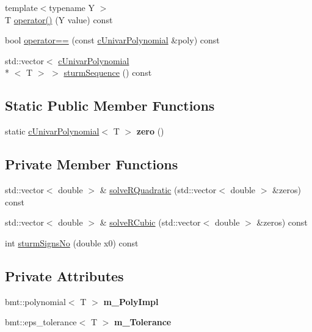 \begin{DoxyCompactItemize}
\item 
{\footnotesize template$<$typename Y $>$ }\\T \hyperlink{classcUnivarPolynomial_ada17ad11d4de132218ef45dcfb052ba4}{operator()} (Y value) const 
\item 
bool \hyperlink{classcUnivarPolynomial_a54e506b4fac4647cc8aad776ba131940}{operator==} (const \hyperlink{classcUnivarPolynomial}{c\-Univar\-Polynomial} \&poly) const 
\item 
std\-::vector$<$ \hyperlink{classcUnivarPolynomial}{c\-Univar\-Polynomial}\\*
$<$ T $>$ $>$ \hyperlink{classcUnivarPolynomial_a936aa1a9e68b7005af72be0fbb2d91ac}{sturm\-Sequence} () const 
\end{DoxyCompactItemize}
\subsection*{Static Public Member Functions}
\begin{DoxyCompactItemize}
\item 
\hypertarget{classcUnivarPolynomial_ae6d336689220ead8386c08aa5e7b540b}{static \hyperlink{classcUnivarPolynomial}{c\-Univar\-Polynomial}$<$ T $>$ {\bfseries zero} ()}\label{classcUnivarPolynomial_ae6d336689220ead8386c08aa5e7b540b}

\end{DoxyCompactItemize}
\subsection*{Private Member Functions}
\begin{DoxyCompactItemize}
\item 
std\-::vector$<$ double $>$ \& \hyperlink{classcUnivarPolynomial_a887727886c8d9ed3a789b10de1c50785}{solve\-R\-Quadratic} (std\-::vector$<$ double $>$ \&zeros) const 
\item 
std\-::vector$<$ double $>$ \& \hyperlink{classcUnivarPolynomial_a9203e9c2e0c7d1f4d70c13b08e37d5ff}{solve\-R\-Cubic} (std\-::vector$<$ double $>$ \&zeros) const 
\item 
int \hyperlink{classcUnivarPolynomial_a3faca94991f37531436883070bcc7f01}{sturm\-Signs\-No} (double x0) const 
\end{DoxyCompactItemize}
\subsection*{Private Attributes}
\begin{DoxyCompactItemize}
\item 
\hypertarget{classcUnivarPolynomial_a76cee4a4b33c7ca3b2b23b7310f937e0}{bmt\-::polynomial$<$ T $>$ {\bfseries m\-\_\-\-Poly\-Impl}}\label{classcUnivarPolynomial_a76cee4a4b33c7ca3b2b23b7310f937e0}

\item 
\hypertarget{classcUnivarPolynomial_a144f68114be5e7f026f40d44c8d5fedd}{bmt\-::eps\-\_\-tolerance$<$ T $>$ {\bfseries m\-\_\-\-Tolerance}}\label{classcUnivarPolynomial_a144f68114be5e7f026f40d44c8d5fedd}

\end{DoxyCompactItemize}
